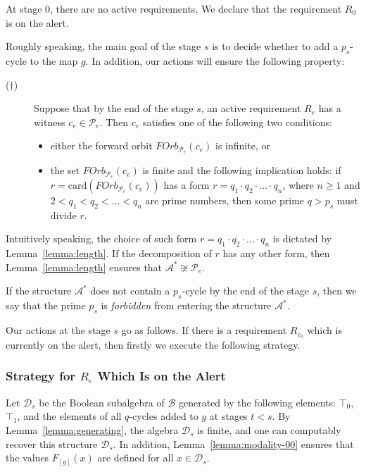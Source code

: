 \documentclass[a4paper,UKenglish,cleveref, autoref, thm-restate]{lipics-v2021}
\begin{document}
 At stage $0$, there are no active requirements. We declare that the requirement $R_0$ is on the alert. 



 Roughly speaking, the main goal of the stage $s$ is to decide whether to add a $p_{s}$-cycle to the map $g$. 
In addition, our actions will ensure the following property:
\begin{description} 
	\item[($\dagger$)] Suppose that by the end of the stage $s$, an active requirement $R_e$ has a witness $c_e\in \mathcal{P}_e$. Then $c_e$ satisfies one of the following two conditions:
	\begin{itemize}
		\item either the forward orbit $FOrb_{\mathcal{P}_e}(c_e)$ is infinite, or
		
		\item the set $FOrb_{\mathcal{P}_e}(c_e)$ is finite and the following implication holds:
		if $r = \mathrm{card}(FOrb_{\mathcal{P}_e}(c_e))$ has a form $r = q_1 \cdot q_2 \cdot \ldots \cdot q_n$, where $n\geq 1$ and $2 < q_1 <q_2 <\dots < q_n$ are prime numbers, then some prime $q > p_s$ must divide $r$.
	\end{itemize}
\end{description}
Intuitively speaking, the choice of such form $r = q_1 \cdot q_2 \cdot \ldots \cdot q_n$ is dictated by Lemma~\ref{lemma:length}. If the decomposition of $r$ has any other form, then Lemma~\ref{lemma:length} ensures that $\mathcal{A}^{\ast} \not\cong \mathcal{P}_e$.


If the structure $\mathcal{A}^{\ast}$ does not contain a $p_{s}$-cycle by the end of the stage $s$, then we say that the prime $p_s$ is \emph{forbidden} from entering the structure $\mathcal{A}^{\ast}$.



Our actions at the stage $s$ go as follows. If there is a requirement $R_{e_0}$ which is currently on the alert, then firstly we execute the following strategy.


\subsubsection{Strategy for $R_e$ Which Is on the Alert}

Let $\mathcal{D}_s$ be the Boolean subalgebra of $\mathcal{B}$ generated by the following elements: $\top_0$, $\top_1$, and the elements of all $q$-cycles added to $g$ at stages $t < s$. By Lemma~\ref{lemma:generating}, the algebra $\mathcal{D}_s$ is finite, and one can computably recover this structure $\mathcal{D}_s$. In addition, Lemma~\ref{lemma:modality-00} ensures that the values $F_{[g]}(x)$ are defined for all $x\in \mathcal{D}_s$.
\end{document}
